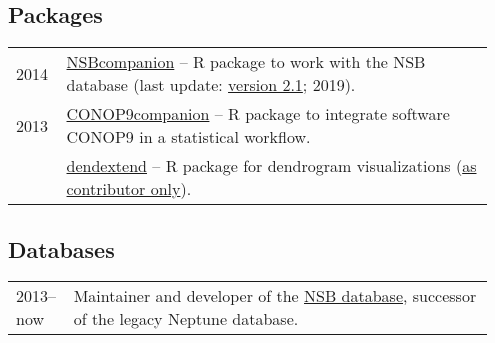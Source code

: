 \documentclass[11pt, a4paper]{article}
\begin{document}
\subsection{Packages}
\begin{longtable}{@{}p{0.1\linewidth} P{0.85\linewidth}@{}}
2014 & \href{http://github.com/plannapus/NSBcompanion}{NSBcompanion} -- R package to work with the NSB database (last update: \href{http://doi.org/10.5281/zenodo.3408198}{version 2.1}; 2019).\\
2013 & \href{http://github.com/plannapus/CONOP9companion}{CONOP9companion} -- R package to integrate software CONOP9 in a statistical workflow.\\
     & \href{https://cran.r-project.org/web/packages/dendextend/index.html}{dendextend} -- R package for dendrogram visualizations (\underline{as contributor only}).\\
\end{longtable}
\subsection{Databases}
\begin{longtable}{@{}p{0.1\linewidth} P{0.85\linewidth}@{}}
2013--now  & Maintainer and developer of the \href{http://nsb-mfn-berlin.de/}{NSB database}, successor of the legacy Neptune database.\\
\end{longtable}
\end{document}

